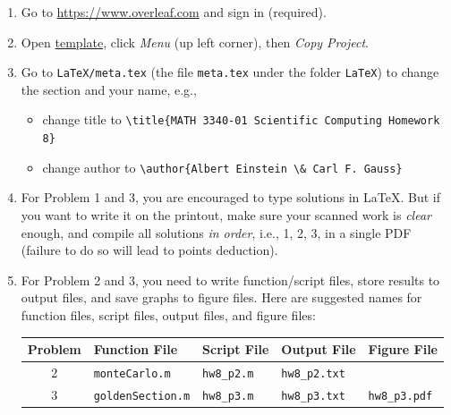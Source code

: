 \begin{enumerate}[label={\arabic*.}]
  \item Go to \url{https://www.overleaf.com} and sign in (required).
  \item Open \href{https://www.overleaf.com/read/zjbxnkfbdtcf}{template}, click \emph{Menu} (up left corner), then \emph{Copy Project}.
  \item Go to \verb|LaTeX/meta.tex| (the file \verb|meta.tex| under the folder \verb|LaTeX|) to change the section and your name, e.g.,
    \begin{itemize}
      \item change title to \verb|\title{MATH 3340-01 Scientific Computing Homework 8}|
      \item change author to \verb|\author{Albert Einstein \& Carl F. Gauss}|
    \end{itemize}
  \item For Problem 1 and 3, you are encouraged to type solutions in \LaTeX{}. But if you want to write it on the printout, make sure your scanned work is \emph{clear} enough, and compile all solutions \emph{in order}, i.e., 1, 2, 3, in a single PDF (failure to do so will lead to points deduction).
  \item For Problem 2 and 3, you need to write function/script files, store results to output files, and save graphs to figure files. Here are suggested names for function files, script files, output files, and figure files:
    \begin{table}[!hbtp]
      \centering
      \begin{tabular}{cllll}
        \toprule
        Problem & Function File          & Script File     & Output File       & Figure File         \\
        \midrule
        2       & \verb|monteCarlo.m|    & \verb|hw8_p2.m| & \verb|hw8_p2.txt| &                     \\
        3       & \verb|goldenSection.m| & \verb|hw8_p3.m| & \verb|hw8_p3.txt| & \verb|hw8_p3.pdf|   \\
        \bottomrule
      \end{tabular}
    \end{table}


\end{enumerate}
